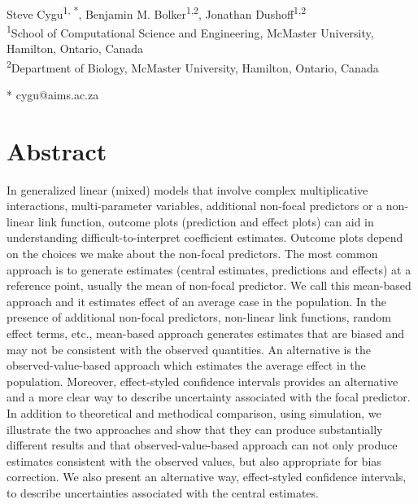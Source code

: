 \begin{flushleft}
{\Large
\textbf{} %
}
\newline
\\
Steve Cygu\textsuperscript{1, *},
Benjamin M. Bolker\textsuperscript{1,2},
Jonathan Dushoff\textsuperscript{1,2}
\\
\bigskip
\textsuperscript{1}School of Computational Science and Engineering, McMaster University, Hamilton, Ontario, Canada
\\
\textsuperscript{2}Department of Biology, McMaster University, Hamilton, Ontario, Canada
\\
\bigskip


* cygu@aims.ac.za

\end{flushleft}
\section*{Abstract}


In generalized linear (mixed) models that involve complex multiplicative interactions, multi-parameter variables, additional non-focal predictors or a non-linear link function, outcome plots (prediction and effect plots) can aid in understanding difficult-to-interpret coefficient estimates. Outcome plots depend on the choices we make about the non-focal predictors.
The most common approach is to generate estimates (central estimates, predictions and effects) at a reference point, usually the mean of non-focal predictor. We call this mean-based approach and it estimates effect of an average case in the population. In the presence of additional non-focal predictors, non-linear link functions, random effect terms, etc., mean-based approach generates estimates that are biased and may not be consistent with the observed quantities. An alternative is the observed-value-based approach which estimates the average effect in the population. Moreover, effect-styled confidence intervals provides an alternative and a more clear way to describe uncertainty associated with the focal predictor. In addition to theoretical and methodical comparison, using simulation, we illustrate the two approaches and show that they can produce substantially different results and that observed-value-based approach can not only produce estimates consistent with the observed values, but also appropriate for bias correction. We also present an alternative way, effect-styled confidence intervals, to describe uncertainties associated with the central estimates.


